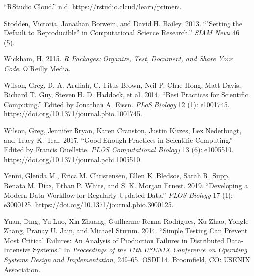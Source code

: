 \documentclass[
]{article}
\newlength{\cslhangindent}
\newenvironment{cslreferences}%
  {\setlength{\parindent}{0pt}%
  \everypar{\setlength{\hangindent}{\cslhangindent}}\ignorespaces}%
  {\par}
\begin{document}
\begin{cslreferences}
\leavevmode\hypertarget{ref-_rstudiocloud_}{}%
``RStudio Cloud.'' n.d. https://rstudio.cloud/learn/primers.

\leavevmode\hypertarget{ref-stodden_setting_2013}{}%
Stodden, Victoria, Jonathan Borwein, and David H. Bailey. 2013. ``"Setting the Default to Reproducible'' in Computational Science Research.'' \emph{SIAM News} 46 (5).

\leavevmode\hypertarget{ref-wickham_r_2015}{}%
Wickham, H. 2015. \emph{R Packages: Organize, Test, Document, and Share Your Code}. O'Reilly Media.

\leavevmode\hypertarget{ref-wilson_best_2014}{}%
Wilson, Greg, D. A. Aruliah, C. Titus Brown, Neil P. Chue Hong, Matt Davis, Richard T. Guy, Steven H. D. Haddock, et al. 2014. ``Best Practices for Scientific Computing.'' Edited by Jonathan A. Eisen. \emph{PLoS Biology} 12 (1): e1001745. \url{https://doi.org/10.1371/journal.pbio.1001745}.

\leavevmode\hypertarget{ref-wilson_good_2017}{}%
Wilson, Greg, Jennifer Bryan, Karen Cranston, Justin Kitzes, Lex Nederbragt, and Tracy K. Teal. 2017. ``Good Enough Practices in Scientific Computing.'' Edited by Francis Ouellette. \emph{PLOS Computational Biology} 13 (6): e1005510. \url{https://doi.org/10.1371/journal.pcbi.1005510}.

\leavevmode\hypertarget{ref-yenni_developingmoderndata_2019}{}%
Yenni, Glenda M., Erica M. Christensen, Ellen K. Bledsoe, Sarah R. Supp, Renata M. Diaz, Ethan P. White, and S. K. Morgan Ernest. 2019. ``Developing a Modern Data Workflow for Regularly Updated Data.'' \emph{PLOS Biology} 17 (1): e3000125. \url{https://doi.org/10.1371/journal.pbio.3000125}.

\leavevmode\hypertarget{ref-yuan_simpletestingcan_2014}{}%
Yuan, Ding, Yu Luo, Xin Zhuang, Guilherme Renna Rodrigues, Xu Zhao, Yongle Zhang, Pranay U. Jain, and Michael Stumm. 2014. ``Simple Testing Can Prevent Most Critical Failures: An Analysis of Production Failures in Distributed Data-Intensive Systems.'' In \emph{Proceedings of the 11th USENIX Conference on Operating Systems Design and Implementation}, 249--65. OSDI'14. Broomfield, CO: USENIX Association.
\end{cslreferences}
\end{document}
